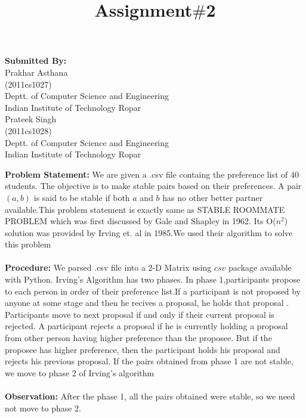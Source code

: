 \documentclass[12pt]{article}
\begin{document}
\title{Assignment$\#$2}\maketitle
\vspace*{190px}
\begin{flushleft}
\textbf{Submitted By:}\\
Prakhar Asthana\\
(2011cs1027)\\
Deptt. of Computer Science and Engineering\\
Indian Institute of Technology Ropar\\

Prateek Singh\\
(2011cs1028)\\
Deptt. of Computer Science and Engineering\\
Indian Institute of Technology Ropar
\end{flushleft}
\pagebreak
\textbf{Problem Statement:} We are given a .csv file containg the preference list of 40 students.  The objective is to make stable pairs based on their preferences. A pair $(a,b)$ is said to be stable if both $a$ and $b$ has no other better partner available.This problem statement is exactly same as STABLE ROOMMATE PROBLEM which was first discussed by Gale and Shapley in 1962. Its O($n^2$) solution was provided by Irving et. al in 1985.We used their algorithm to solve this problem\\\\
\textbf{Procedure:} We parsed .csv file into a 2-D Matrix using $csv$ package available with Python. Irving's Algorithm has two phases. In phase 1,participants propose to each person in order of their preference list.If a participant is not proposed by anyone at some stage and then he recives a proposal, he holds that proposal . Participants move to next proposal if and only if their current proposal is rejected. A participant rejects a proposal if he is currently holding a proposal from other person having higher preference than the proposee. But if the proposee has higher preference, then the participant holds his proposal and rejects his previous proposal. If the pairs obtained from phase 1 are not stable, we move to phase 2 of Irving's algorithm
\\\\
\textbf{Observation:} After the phase 1, all the pairs obtained were stable, so we need not move to phase 2.\\
\end{document}
